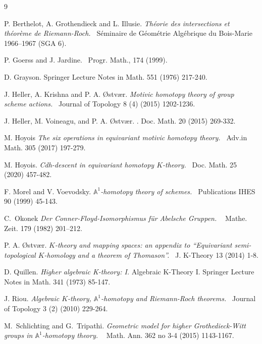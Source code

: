 \documentclass[11pt,twoside]{amsart}
\theoremstyle{definition}
\theoremstyle{remark}
\numberwithin{equation}{section}
\begin{document}
\begin{thebibliography}{9}


P. Berthelot, A. Grothendieck and L. Illusie.
{\it Théorie des intersections et théorème de Riemann-Roch.\ }
\newblock Séminaire de Géométrie Algébrique du Bois-Marie 1966–1967 (SGA 6).

P. Goerss and J. Jardine.
\ 
\newblock Progr. Math., 174 (1999).

D. Grayson.
\newblock Springer Lecture Notes in Math.  551 (1976)   217-240.

J. Heller, A. Krishna and P. A. \O stv\ae r.
{\it Motivic homotopy theory of group scheme actions.\ }
 \newblock Journal of Topology 8 (4) (2015) 1202-1236.


J. Heller, M. Voineagu, and P. A. \O stv\ae r.
. 
\newblock Doc. Math. 20 (2015)  269-332. 

M. Hoyois
{\it The six operations in equivariant motivic homotopy theory.\ }
\newblock Adv.in Math. 305 (2017) 197-279.

M. Hoyois.
{\it Cdh-descent in equivariant homotopy $K$-theory.\ }
 \newblock Doc. Math. 25 (2020) 457-482.



F. Morel and V. Voevodsky.
{\it  $\mathbb{A}^1$-homotopy theory of schemes.\ }
\newblock Publications IHES 90 (1999)  45-143.

C.~Okonek
{\it Der Conner-Floyd-Isomorphismus für Abelsche Gruppen. \ }
\newblock Mathe. Zeit. 179 (1982) 201–212.


P. A. \O stv\ae r.
{\it $K$-theory and mapping spaces:
an appendix to
“Equivariant semi-topological $K$-homology
and a theorem of Thomason”.\ }
 \newblock J. K-Theory 13 (2014)  1-8.

D. Quillen.
{\it Higher algebraic K-theory: I.}
 \newblock Algebraic K-Theory I.  Springer Lecture Notes in Math. 341  (1973) 85-147. 


J. Riou. 
{\it Algebraic $K$-theory, $\mathbb{A}^1$-homotopy and Riemann-Roch theorems.\ }
 \newblock Journal of Topology 3 (2) (2010) 229-264.


M.~Schlichting and G.~Tripathi.
{\it Geometric model for higher Grothedieck-Witt groups in $\mathbb{A}^1$-homotopy theory. \ } Math. Ann. 362 no 3-4 (2015) 1143-1167.


\end{thebibliography}
\end{document}
